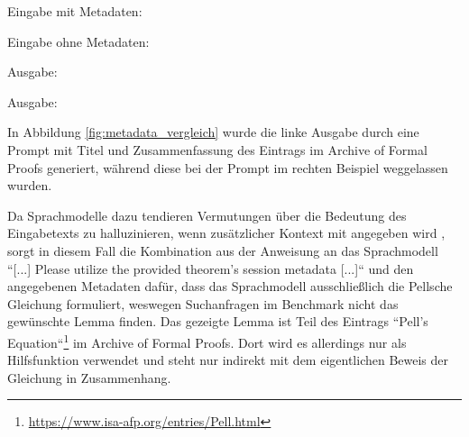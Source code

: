 \documentclass[12pt,letterpaper]{article} %
\begin{document}
\centering
\begin{minipage}[t]{0.495\textwidth}
    \scriptsize
    \begin{mybox}{Eingabe mit Metadaten:}
    \texttt{}
    \end{mybox}
\end{minipage}
\begin{minipage}[t]{0.495\textwidth}
    \scriptsize
    \begin{mybox}{Eingabe ohne Metadaten:}
    \texttt{}
    \end{mybox}
\end{minipage}
\begin{minipage}[t]{0.495\textwidth}
    \scriptsize
    \begin{mybox}{Ausgabe:}
    \texttt{}
    \end{mybox}
\end{minipage}
\begin{minipage}[t]{0.495\textwidth}
    \scriptsize
    \begin{mybox}{Ausgabe:}
    \texttt{}
    \end{mybox}
\end{minipage}
\label{fig:metadata_vergleich}
\vspace{1em}
\justifying

In Abbildung \ref{fig:metadata_vergleich} wurde die linke Ausgabe durch eine Prompt mit Titel und Zusammenfassung des Eintrags im Archive of Formal Proofs generiert, während diese bei der Prompt im rechten Beispiel weggelassen wurden.

Da Sprachmodelle dazu tendieren Vermutungen über die Bedeutung des Eingabetexts zu halluzinieren, wenn zusätzlicher Kontext mit angegeben wird \citep[S. 1]{bang_hallulens_2025}, sorgt in diesem Fall die Kombination aus der Anweisung an das Sprachmodell ``[...] Please utilize the provided theorem's session metadata [...]`` und den angegebenen Metadaten dafür, dass das Sprachmodell ausschließlich die Pellsche Gleichung formuliert, weswegen Suchanfragen im Benchmark nicht das gewünschte Lemma finden.
Das gezeigte Lemma ist Teil des Eintrags ``Pell's Equation``\footnote{\url{https://www.isa-afp.org/entries/Pell.html}} im Archive of Formal Proofs. Dort wird es allerdings nur als Hilfsfunktion verwendet und steht nur indirekt mit dem eigentlichen Beweis der Gleichung in Zusammenhang.
\end{document}
